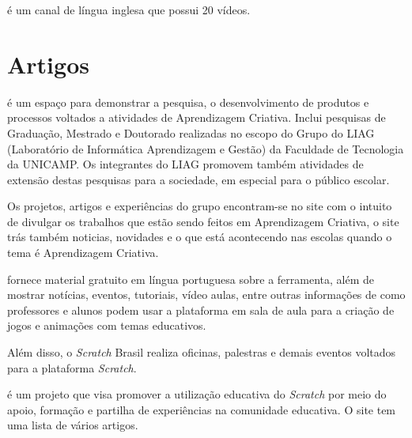 \documentclass[12pt,fleqn]{book} %
\begin{document}
\textcite{blank2018} é um canal de língua inglesa que possui 20 vídeos.

\section{Artigos}

\textcite{liag2018} é um espaço para demonstrar a pesquisa, o desenvolvimento de produtos e processos voltados a atividades de Aprendizagem Criativa. Inclui pesquisas de Graduação, Mestrado e Doutorado realizadas no escopo do Grupo do LIAG (Laboratório de Informática Aprendizagem e Gestão) da Faculdade de Tecnologia da UNICAMP. Os integrantes do LIAG promovem também atividades de extensão destas pesquisas para a sociedade, em especial para o público escolar.

Os projetos, artigos e experiências do grupo encontram-se no site com o intuito de divulgar os trabalhos que estão sendo feitos em Aprendizagem Criativa, o site trás também noticias, novidades e o que está acontecendo nas escolas quando o tema é Aprendizagem Criativa.

\textcite{scratchbrasil2018} fornece material gratuito em língua portuguesa sobre a ferramenta, além de mostrar notícias, eventos, tutoriais, vídeo aulas, entre outras informações de como professores e alunos podem usar a plataforma em sala de aula para a criação de jogos e animações com temas educativos.

Além disso, o \textit{Scratch} Brasil realiza oficinas, palestras e demais eventos voltados para a plataforma \textit{Scratch}.

\textcite{eduscratch2018} é um projeto que visa promover a utilização educativa do \textit{Scratch} por meio do apoio, formação e partilha de experiências na comunidade educativa. O site tem uma lista de vários artigos. 



\end{document}
